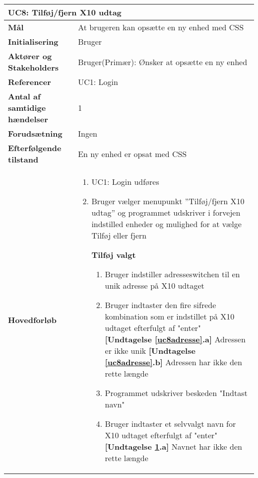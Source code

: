 \begin{table}[H] \centering
\begin{tabular}{|p{5cm}|p{9cm}|}
	\hline
		\multicolumn{2}{|l|}{\textbf{UC8: Tilføj/fjern X10 udtag}} \\\hline
		
		\textbf{Mål}							&At brugeren kan opsætte en ny enhed med CSS						\\\hline
		\textbf{Initialisering}				&Bruger					 										\\\hline
		\textbf{Aktører og Stakeholders}		&Bruger(Primær): Ønsker at opsætte en ny enhed					\\\hline
		\textbf{Referencer}					&UC1: Login														\\\hline
		\textbf{Antal af samtidige hændelser}&1 																\\\hline
		\textbf{Forudsætning}				&Ingen															\\\hline
		\textbf{Efterfølgende tilstand}		&En ny enhed er opsat med CSS									\\\hline
		\textbf{Hovedforløb}					
			&\begin{enumerate}

				\item UC1: Login udføres
				
				\item Bruger vælger menupunkt ''Tilføj/fjern X10 udtag'' og programmet udskriver i forvejen indstilled enheder og mulighed for at vælge Tilføj eller fjern
					
				\subitem \textbf{Tilføj valgt}			
				\begin{enumerate}
					\item \label{uc8indstilAdresse} Bruger indstiller adresseswitchen til en unik adresse på X10 udtaget

					\item \label{uc8adresse} Bruger indtaster den fire sifrede kombination som er indstillet på X10 udtaget efterfulgt af "enter"\newline
						\textbf{[Undtagelse \ref{uc8adresse}.a]} Adressen er ikke unik\newline
						\textbf{[Undtagelse \ref{uc8adresse}.b]} Adressen har ikke den rette længde
				
					\item \label{uc8indstilNavn} Programmet udskriver beskeden "Indtast navn"
				
					\item \label{uc8navn} Bruger indtaster et selvvalgt navn for X10 udtaget efterfulgt af "enter"\newline
						\textbf{[Undtagelse \ref{uc8navn}.a]} Navnet har ikke den rette længde
				

\end{enumerate}
\end{enumerate}
\end{tabular}
\end{table}

